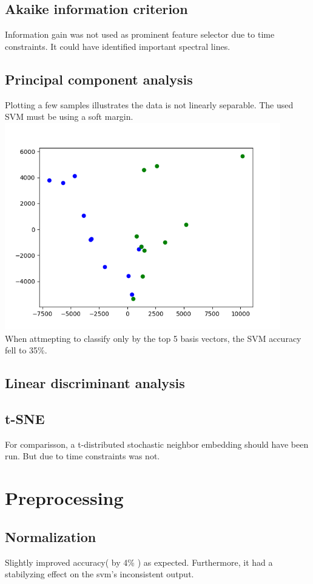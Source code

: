 \documentclass{article}
\begin{document}
\subsection{Akaike information criterion}
Information gain was not used as prominent feature selector due to time constraints.
It could have identified important spectral lines.


\subsection{Principal component analysis}
Plotting a few samples illustrates the data is not linearly separable.
The used SVM must be using a soft margin.
\\
\includegraphics[width=0.9\textwidth]{img/pca}
\\
When attmepting to classify only by the top 5 basis vectors, the SVM accuracy fell to 35\%.


\subsection{Linear discriminant analysis}


\subsection{t-SNE}
For comparisson, a t-distributed stochastic neighbor embedding should have been run.
But due to time constraints was not.


\section{Preprocessing}
\subsection{Normalization}
Slightly improved accuracy( by 4\% ) as expected.
Furthermore, it had a stabilyzing effect on the svm's inconsistent output.
\end{document}
